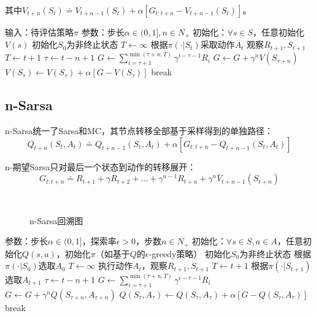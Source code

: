 \documentclass[
12pt, %
a4paper, 
oneside, %
headinclude,footinclude, %
]{scrartcl}
\begin{document}
其中$ V_{t + n}(S_t) \doteq V_{t + n - 1}(S_t) + \alpha[G_{t:t + n} - V_{t + n - 1}(S_t)] $。
\begin{myalgorithm}[n-TD]
\State 输入：待评估策略$ \pi $
\State 参数：步长$ \alpha \in (0,1], n \in N_+ $
\State 初始化：$ \forall s \in S $，任意初始化$ V(s) $
\State 初始化$ S_0 $为非终止状态
\State $ T \gets \infty $
\State 根据$ \pi(\cdot|S_t) $采取动作$ A_t $
\State 观察$ R_{t + 1},S_{t + 1} $
\State $ T \gets t + 1 $
\EndIf
\EndIf
\State $ \tau \gets t - n + 1 $ 
\State $ G \gets \sum_{i = \tau + 1}^{\min(\tau + n,T)} \gamma^{i - \tau - 1}R_i $
\State $ G \gets G + \gamma^n V(S_{\tau + n}) $
\EndIf
\State $ V(S_{\tau}) \gets V(S_{\tau}) + \alpha[G - V(S_{\tau})] $
\EndIf
{}
\State break
\EndIf
\EndFor
\EndFor
\end{myalgorithm}
\subsection{n-Sarsa}
n-Sarsa统一了Sarsa和MC，其节点转移全部基于采样得到的单独路径：
$$ Q_{t + n}(S_t, A_t) \doteq Q_{t + n - 1}(S_t, A_t) + \alpha [G_{t:t + n} - Q_{t + n - 1}(S_t, A_t)] $$

n-期望Sarsa只对最后一个状态到动作的转移展开：
$$ G_{t:t + n} \doteq R_{t + 1} + \gamma R_{t + 2} + \dots + \gamma^{n - 1} R_{t + n} + \gamma^n \bar{V}_{t + n - 1}(S_{t + n}) $$

\begin{figure}[H]
\centering
{} \\
\caption[n-Sarsa回溯图]{n-Sarsa回溯图}
\end{figure}
\begin{myalgorithm}[n-Sarsa]
\State 参数：步长$ \alpha \in (0,1] $，探索率$ \epsilon > 0 $，步数$ n \in N_+ $
\State 初始化：$ \forall s \in S, a \in A $，任意初始化$ Q(s, a) $，初始化$ \pi $（如基于$ Q $的$ \epsilon $-greedy策略）
\State 初始化$ S_0 $为非终止状态
\State 根据$ \pi(\cdot|S_0) $选取$ A_0 $
\State $ T \gets \infty $
\State 执行动作$ A_t $，观察$ R_{t + 1},S_{t + 1} $
\State $ T \gets t + 1 $
\Else
\State 根据$ \pi(\cdot|S_{t + 1}) $选取$ A_{t + 1} $
\EndIf
\EndIf
\State $ \tau \gets t - n + 1$ 
\State $ G \gets \sum_{i = \tau + 1}^{\min(\tau + n,T)} \gamma^{i - \tau - 1}R_i $
\State $ G \gets G + \gamma^n Q(S_{\tau + n}, A_{\tau + n}) $
\EndIf
\State $ Q(S_{\tau}, A_{\tau}) \gets Q(S_{\tau}, A_{\tau}) + \alpha[G - Q(S_{\tau}, A_{\tau})] $
\EndIf
{}
\State break
\EndIf
\EndFor
\EndFor
\end{myalgorithm}
\end{document}
